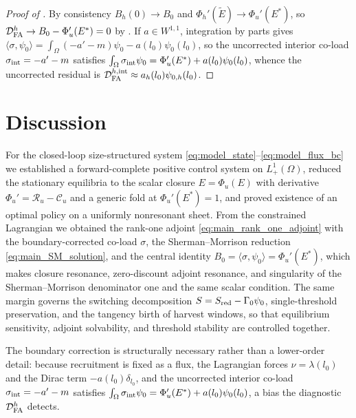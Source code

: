 \documentclass[a4paper,fleqn,longmktitle]{cas-sc}
\theoremstyle{plain}
\theoremstyle{definition}
\theoremstyle{remark}
\numberwithin{equation}{section}
\begin{document}
\begin{proof}[Proof of ]
By consistency \(B_h(0)\to B_0\) and \(\Phi_h'(\widetilde E)\to\Phi_u'(E^*)\),
so \(\mathcal D_{\rm FA}^h\to B_0-\Phi_u'(E^*)=0\) by
. If \(a\in W^{1,1}\), integration by
parts gives \(\langle\sigma,\psi_0\rangle=\int_\Omega(-a'-m)\psi_0-a(l_0)\psi_0(l_0)\),
so the uncorrected interior co-load \(\sigma_{\rm int}=-a'-m\) satisfies
\(\int_\Omega\sigma_{\rm int}\psi_0=\Phi_u'(E^*)+a(l_0)\psi_0(l_0)\), whence the
uncorrected residual is \(\mathcal D_{\rm FA}^{h,\rm int}\approx a_h(l_0)\psi_{0,h}(l_0)\).
\end{proof}

\section{Discussion}
\label{sec:conclusion}
For the closed-loop size-structured system
\eqref{eq:model_state}--\eqref{eq:model_flux_bc} we established a
forward-complete positive control system on \(L^1_+(\Omega)\), reduced the
stationary equilibria to the scalar closure \(E=\Phi_u(E)\) with derivative
\(\Phi_u'=\mathcal R_u-\mathcal C_u\) and a generic fold at
\(\Phi_u'(E^*)=1\), and proved existence of an optimal policy on a uniformly
nonresonant sheet. From the constrained Lagrangian we obtained the rank-one
adjoint \eqref{eq:main_rank_one_adjoint} with the boundary-corrected co-load
\(\sigma\), the Sherman--Morrison reduction \eqref{eq:main_SM_solution}, and the
central identity
$B_0=\langle\sigma,\psi_0\rangle=\Phi_u'(E^*)$,
which makes closure resonance, zero-discount adjoint resonance, and singularity
of the Sherman--Morrison denominator one and the same scalar condition. The
same margin governs the switching decomposition
\(S=S_{\rm red}-\Gamma_0\psi_0\), single-threshold preservation, and the
tangency birth of harvest windows, so that equilibrium sensitivity, adjoint
solvability, and threshold stability are controlled together.

The boundary correction is structurally necessary rather than a lower-order
detail: because recruitment is fixed as a flux, the Lagrangian forces
\(\nu=\lambda(l_0)\) and the Dirac term \(-a(l_0)\delta_{l_0}\), and the
uncorrected interior co-load \(\sigma_{\rm int}=-a'-m\) satisfies
\(\int_\Omega\sigma_{\rm int}\psi_0=\Phi_u'(E^*)+a(l_0)\psi_0(l_0)\), a bias the
diagnostic \(\mathcal D_{\rm FA}^h\) detects.
\end{document}
